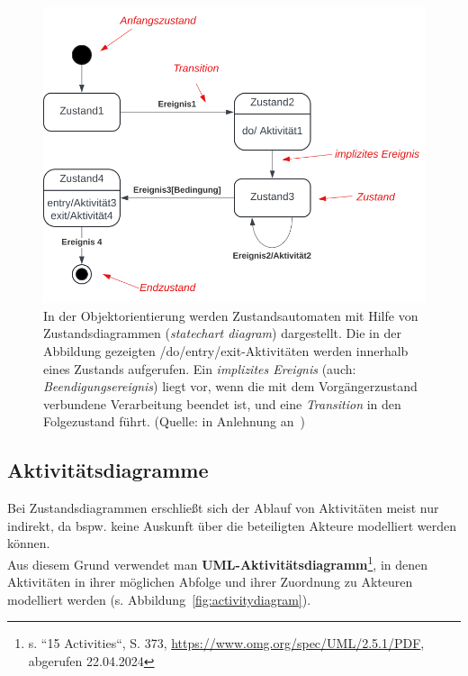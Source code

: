 \begin{figure}
    \centering
    \includegraphics[scale=0.4]{part two/Objektorientierte Analyse/img/statediagram}
    \caption{In der Objektorientierung werden Zustandsautomaten mit Hilfe von Zustandsdiagrammen (\textit{statechart diagram}) dargestellt. Die in der Abbildung gezeigten /do/entry/exit-Aktivitäten werden innerhalb eines Zustands aufgerufen. Ein \textit{implizites Ereignis} (auch: \textit{Beendigungsereignis}) liegt vor, wenn die mit dem Vorgängerzustand verbundene Verarbeitung beendet ist, und eine \textit{Transition} in den Folgezustand führt. (Quelle: in Anlehnung an~\cite[90, Abb. 2.11-6]{Bal05})}
    \label{fig:statediagram}
\end{figure}

\subsection*{Aktivitätsdiagramme}
Bei Zustandsdiagrammen erschließt sich der Ablauf von Aktivitäten meist nur indirekt, da bspw. keine Auskunft über die beteiligten Akteure modelliert werden können.\\

\noindent
Aus diesem Grund verwendet man \textbf{UML-Aktivitätsdiagramm}\footnote{
s. ``15 Activities``, S. 373, \url{https://www.omg.org/spec/UML/2.5.1/PDF}, abgerufen 22.04.2024
}, in denen Aktivitäten in ihrer möglichen Abfolge und ihrer Zuordnung zu Akteuren modelliert werden (s. Abbildung~\ref{fig:activitydiagram}).\\

